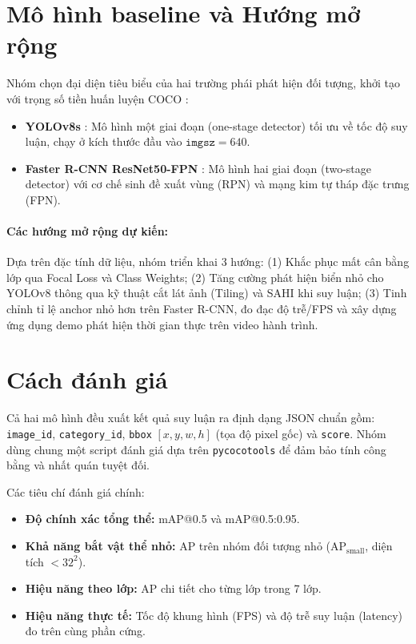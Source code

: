 \documentclass[11pt]{article}
\begin{document}

\section{Mô hình baseline và Hướng mở rộng}

Nhóm chọn đại diện tiêu biểu của hai trường phái phát hiện đối tượng, khởi tạo với trọng số tiền huấn luyện COCO \citep{lin2014coco}:

\begin{itemize}
\itemsep0pt
\item \textbf{YOLOv8s} \citep{jocher2023ultralytics}: Mô hình một giai đoạn (one-stage detector) tối ưu về tốc độ suy luận, chạy ở kích thước đầu vào $\texttt{imgsz}=640$.
\item \textbf{Faster R-CNN ResNet50-FPN} \citep{ren2015faster,lin2017fpn}: Mô hình hai giai đoạn (two-stage detector) với cơ chế sinh đề xuất vùng (RPN) và mạng kim tự tháp đặc trưng (FPN).
\end{itemize}

\paragraph{Các hướng mở rộng dự kiến:}
Dựa trên đặc tính dữ liệu, nhóm triển khai 3 hướng:
(1) Khắc phục mất cân bằng lớp qua Focal Loss và Class Weights;
(2) Tăng cường phát hiện biển nhỏ cho YOLOv8 thông qua kỹ thuật cắt lát ảnh (Tiling) và SAHI khi suy luận;
(3) Tinh chỉnh tỉ lệ anchor nhỏ hơn trên Faster R-CNN, đo đạc độ trễ/FPS và xây dựng ứng dụng demo phát hiện thời gian thực trên video hành trình.


\section{Cách đánh giá}

Cả hai mô hình đều xuất kết quả suy luận ra định dạng JSON chuẩn gồm: \texttt{image\_id}, \texttt{category\_id}, \texttt{bbox} $[x,y,w,h]$ (tọa độ pixel gốc) và \texttt{score}. Nhóm dùng chung một script đánh giá dựa trên \texttt{pycocotools} để đảm bảo tính công bằng và nhất quán tuyệt đối.

Các tiêu chí đánh giá chính:
\begin{itemize}
\itemsep0pt
\item \textbf{Độ chính xác tổng thể:} mAP@0.5 và mAP@0.5:0.95.
\item \textbf{Khả năng bắt vật thể nhỏ:} AP trên nhóm đối tượng nhỏ ($\text{AP}_{\text{small}}$, diện tích $< 32^2$).
\item \textbf{Hiệu năng theo lớp:} AP chi tiết cho từng lớp trong 7 lớp.
\item \textbf{Hiệu năng thực tế:} Tốc độ khung hình (FPS) và độ trễ suy luận (latency) đo trên cùng phần cứng.
\end{itemize}
\end{document}
